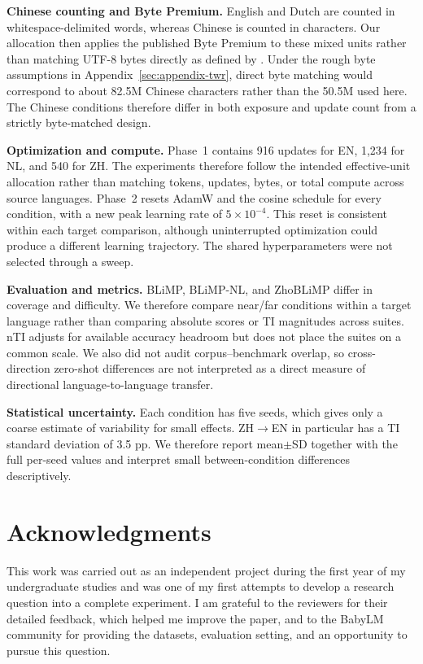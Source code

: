 \documentclass[11pt]{article}
\begin{document}
\textbf{Chinese counting and Byte Premium.} English and Dutch are counted in whitespace-delimited words, whereas Chinese is counted in characters. Our allocation then applies the published Byte Premium to these mixed units rather than matching UTF-8 bytes directly as defined by \citet{arnett-etal-2024-bit}. Under the rough byte assumptions in Appendix~\ref{sec:appendix-twr}, direct byte matching would correspond to about 82.5M Chinese characters rather than the 50.5M used here. The Chinese conditions therefore differ in both exposure and update count from a strictly byte-matched design.

\textbf{Optimization and compute.} Phase~1 contains 916 updates for EN, 1,234 for NL, and 540 for ZH. The experiments therefore follow the intended effective-unit allocation rather than matching tokens, updates, bytes, or total compute across source languages. Phase~2 resets AdamW and the cosine schedule for every condition, with a new peak learning rate of $5\times10^{-4}$. This reset is consistent within each target comparison, although uninterrupted optimization could produce a different learning trajectory. The shared hyperparameters were not selected through a sweep.

\textbf{Evaluation and metrics.} BLiMP, BLiMP-NL, and ZhoBLiMP differ in coverage and difficulty. We therefore compare near/far conditions within a target language rather than comparing absolute scores or TI magnitudes across suites. nTI adjusts for available accuracy headroom but does not place the suites on a common scale. We also did not audit corpus--benchmark overlap, so cross-direction zero-shot differences are not interpreted as a direct measure of directional language-to-language transfer.

\textbf{Statistical uncertainty.} Each condition has five seeds, which gives only a coarse estimate of variability for small effects. ZH$\rightarrow$EN in particular has a TI standard deviation of 3.5 pp. We therefore report mean$\pm$SD together with the full per-seed values and interpret small between-condition differences descriptively.

\section*{Acknowledgments}

This work was carried out as an independent project during the first year of my undergraduate studies and was one of my first attempts to develop a research question into a complete experiment. I am grateful to the reviewers for their detailed feedback, which helped me improve the paper, and to the BabyLM community for providing the datasets, evaluation setting, and an opportunity to pursue this question.
\end{document}
